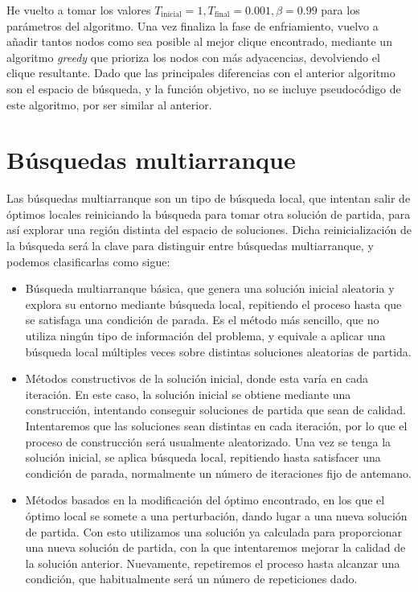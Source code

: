 He vuelto a tomar los valores $T_{\text{inicial}} = 1, T_{\text{final}} = 0.001,
\beta = 0.99$ para los parámetros del algoritmo. Una vez finaliza la fase de enfriamiento,
vuelvo a añadir tantos nodos como sea posible al mejor clique encontrado, mediante un algoritmo
\textit{greedy} que prioriza los nodos con más adyacencias, devolviendo el clique resultante.
Dado que las principales diferencias con el anterior algoritmo son el espacio de búsqueda,
y la función objetivo, no se incluye pseudocódigo de este algoritmo, por ser similar al anterior.

\section{Búsquedas multiarranque}

Las búsquedas multiarranque son un tipo de búsqueda local, que intentan salir de óptimos
locales reiniciando la búsqueda para tomar otra solución de partida, para así explorar
una región distinta del espacio de soluciones. Dicha reinicialización de la búsqueda será
la clave para distinguir entre búsquedas multiarranque, y podemos clasificarlas como sigue:

\begin{itemize}
  \item Búsqueda multiarranque básica, que genera una solución inicial aleatoria y explora su entorno
        mediante búsqueda local, repitiendo el proceso hasta que se satisfaga una condición de parada.
        Es el método más sencillo, que no utiliza ningún tipo de información del problema, y equivale
        a aplicar una búsqueda local múltiples veces sobre distintas soluciones aleatorias de partida.

  \item Métodos constructivos de la solución inicial, donde esta varía en cada iteración. En este caso,
        la solución inicial se obtiene mediante una construcción, intentando conseguir soluciones de
        partida que sean de calidad. Intentaremos que las soluciones sean distintas en cada iteración,
        por lo que el proceso de construcción será usualmente aleatorizado. Una vez se tenga la solución
        inicial, se aplica búsqueda local, repitiendo hasta satisfacer una condición de parada,
        normalmente un número de iteraciones fijo de antemano.

  \item Métodos basados en la modificación del óptimo encontrado, en los que el óptimo local se somete
        a una perturbación, dando lugar a una nueva solución de partida. Con esto utilizamos una
        solución ya calculada para proporcionar una nueva solución de partida, con la que intentaremos
        mejorar la calidad de la solución anterior. Nuevamente, repetiremos el proceso hasta alcanzar
        una condición, que habitualmente será un número de repeticiones dado.
\end{itemize}

